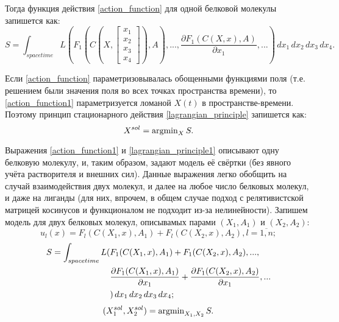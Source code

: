 Тогда функция действия \ref{action_function} для одной белковой молекулы запишется как:
\begin{equation}
	S = \int_{spacetime}L(F_1(C(X, \begin{bmatrix} x_1 \\ x_2 \\ x_3 \\ x_4 \end{bmatrix}), A), ...,\frac{\partial{F_1(C(X, x), A)}}{\partial{x_1}}, ...) \, dx_1 \, dx_2 \, dx_3 \, dx_4.
	\label{action_function1}
\end{equation}

Если \ref{action_function} параметризовывалась обощенными функциями поля (т.е. решением \label{lagrangian_principle} были значения поля во всех точках пространства времени), то
\ref{action_function1} параметризуется ломаной $X(t)$ в пространстве-времени. Поэтому принцип стационарного действия \ref{lagrangian_principle} запишется как:
\begin{equation}
	X^{sol} = \operatorname{argmin}_{X}S.
	\label{lagrangian_principle1}
\end{equation}

Выражения \ref{action_function1} и \ref{lagrangian_principle1} описывают одну белковую молекулу, и, таким образом, задают модель её свёртки (без явного учёта растворителя и внешних сил).
Данные выражения легко обобщить на случай взаимодействия двух молекул, и далее на любое число белковых молекул, и даже на лиганды (для них, впрочем, в общем случае подход с релятивистской
матрицей косинусов и функционалом не подходит из-за нелинейности). Запишем модель для двух белковых молекул, описывамых парами $(X_1, A_1)$ и $(X_2, A_2)$:
\begin{equation}
	u_l(x) = F_l(C(X_1, x), A_1) + F_l(C(X_2, x), A_2), l=\overline{1,n};
	\label{generalized_variables2}
\end{equation}
\begin{align}
	S = \int_{spacetime}L(&F_1(C(X_1, x), A_1) + F_1(C(X_2, x), A_2), ...,\notag \\
						    &\frac{\partial{F_1(C(X_1, x), A_1)}}{\partial{x_1}} + \frac{\partial{F_1(C(X_2, x), A_2)}}{\partial{x_1}}, ... \notag \\
						    &) \, dx_1 \, dx_2 \, dx_3 \, dx_4;
	\label{action_function2}
\end{align}
\begin{equation}
	(X^{sol}_1, X^{sol}_2) = \operatorname{argmin}_{X_1, X_2}S.
	\label{lagrangian_principle2}
\end{equation}

